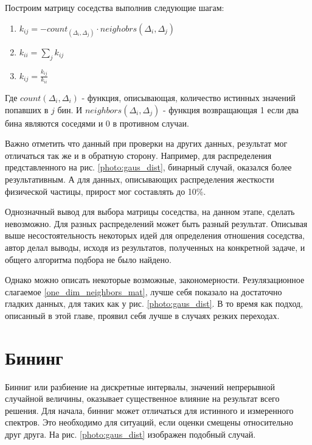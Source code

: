 \documentclass[a4paper,12pt]{diplom}
\begin{document}
Построим матрицу соседства выполнив следующие шагам:

\begin{enumerate}
   \item  $k_{ij} = - count_(\Delta_{i}, \Delta_{j}) \cdot neighobrs(\Delta_{i}, \Delta_{j})$ \\

   \item  $k_{ii} = \displaystyle\sum_{j} k_{ij}$ \\

   \item  $k_{ij} = \frac{k_{ij}}{k_{ii}}$

\end{enumerate}

Где $count(\Delta_{i}, \Delta_{i})$ - функция, описывающая, количество истинных значений попавших в $j$ бин. 
И $neighbors(\Delta_{i}, \Delta_{j})$ - функция возвращающая 1 если два бина являются соседями и 0 в противном случаи.

Важно отметить что данный при проверки на других данных, результат мог отличаться так же и в обратную сторону. Например, для распределения
представленного на рис. \ref{photo:gaus_dist}, бинарный случай, оказался более результативным. А для данных, описывающих распределения жесткости
физической частицы, прирост мог составлять до 10\%.

Однозначный вывод для выбора матрицы соседства, на данном этапе, сделать невозможно. Для разных распределений может быть разный результат. 
Описывая выше несостоятельность некоторых идей для определения отношения соседства, автор делал выводы, исходя из результатов, полученных на 
конкретной задаче, и общего алгоритма подбора не было найдено.

Однако можно описать некоторые возможные, закономерности. Резулязационное слагаемое \eqref{one_dim_neighbors_mat}, лучше себя показало на 
достаточно гладких данных, для таких как у рис. \ref{photo:gaus_dist}. В то время как подход, описанный в этой главе, проявил себя лучше в 
случаях резких переходах.


\section{Бининг}

Бинниг или разбиение на дискретные интервалы, значений непрерывной случайной величины, оказывает существенное влияние на результат всего решения.
Для начала, бинниг может отличаться для истинного и измеренного спектров. Это необходимо для ситуаций, если оценки смещены относительно друг друга. 
На рис. \ref{photo:gaus_dist} изображен подобный случай.
\end{document}

